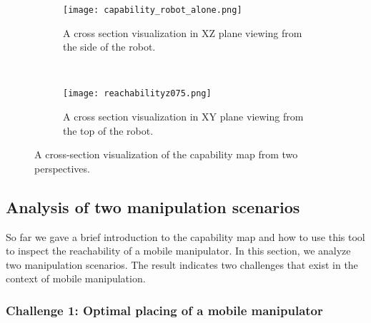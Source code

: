 \begin{figure}[!htbp]
    \centering
    \begin{subfigure}[b]{0.45\textwidth}
        \texttt{[image: capability\_robot\_alone.png]}
        \caption{A cross section visualization in XZ plane viewing from the side of the robot. }
        \label{fig:cmap_view1}
    \end{subfigure}
    ~ %
    \begin{subfigure}[b]{0.45\textwidth}
        \texttt{[image: reachabilityz075.png]}
        \caption{A cross section visualization in XY plane viewing from the top of the robot. }
        \label{fig:cmap_view2}
    \end{subfigure}
    \caption{ A cross-section visualization of the capability map from two perspectives. }\label{fig:cmap_view}
\end{figure}



\subsection{Analysis of two manipulation scenarios} 
\label{sec:analysis2scenarios}
So far we gave a brief introduction to the capability map and how to use this tool to inspect the reachability of a mobile manipulator. In this section, we analyze two manipulation scenarios. The result indicates two challenges that exist in the context of mobile manipulation.  

\subsubsection{Challenge 1: Optimal placing of a mobile manipulator}

